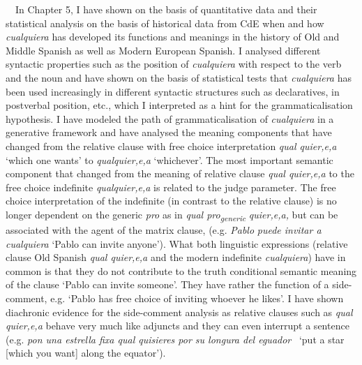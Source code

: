 \begin{styleStandard}
\ \ In Chapter 5, I have shown on the basis of quantitative data and their statistical analysis on the basis of historical data from CdE when and how \textit{cualquiera} has developed its functions and meanings in the history of Old and Middle Spanish as well as Modern European Spanish. I analysed different syntactic properties such as the position of \textit{cualquiera} with respect to the verb and the noun and have shown on the basis of statistical tests that \textit{cualquiera} has been used increasingly in different syntactic structures such as declaratives, in postverbal position, etc., which I interpreted as a hint for the grammaticalisation hypothesis. I have modeled the path of grammaticalisation of \textit{cualquiera} in a generative framework and have analysed the meaning components that have changed from the relative clause with free choice interpretation \textit{qual quier,e,a} ‘which one wants’ to \textit{qualquier,e,a} ‘whichever’. The most important semantic component that changed from the meaning of relative clause \textit{qual quier,e,a} to the free choice indefinite \textit{qualquier,e,a} is related to the judge parameter. The free choice interpretation of the indefinite (in contrast to the relative clause) is no longer dependent on the generic \textit{pro} as in \textit{qual pro}\textit{\textsubscript{generic}}\textit{ quier,e,a,} but can be associated with the agent of the matrix clause, (e.g. \textit{Pablo} \textit{puede invitar a cualquiera }‘Pablo can invite anyone’). What both linguistic expressions (relative clause Old Spanish \textit{qual quier,e,a} and the modern indefinite \textit{cualquiera}) have in common is that they do not contribute to the truth conditional semantic meaning of the clause ‘Pablo can invite someone’. They have rather the function of a side-comment, e.g. ‘Pablo has free choice of inviting whoever he likes’. I have shown diachronic evidence for the side-comment analysis as relative clauses such as \textit{qual quier,e,a} behave very much like adjuncts and they can even interrupt a sentence (e.g. \textit{pon una estrella fixa qual quisieres por su longura del eguador} \ ‘put a star [which you want] along the equator’).
\end{styleStandard}


